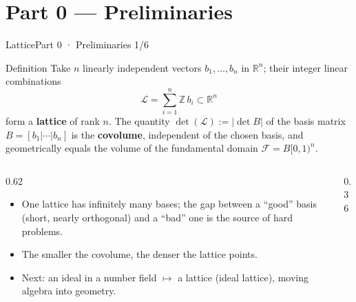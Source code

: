 \documentclass[aspectratio=169, 11pt]{beamer}
\newcommand{\R}{\mathbb{R}}
\newcommand{\Z}{\mathbb{Z}}
\begin{document}
\section{Part 0 --- Preliminaries}

\begin{frame}{Lattice}{Part 0 · Preliminaries 1/6}
  \begin{block}{Definition}
    Take $n$ linearly independent vectors $b_1,\dots,b_n$ in $\R^n$; their integer linear combinations
    \[
      \mathcal{L}=\sum_{i=1}^n \Z\, b_i \subset \R^n
    \]
    form a \textbf{lattice} of rank $n$. The quantity $\det(\mathcal{L}):=|\det B|$ of the basis matrix
    $B=[b_1|\cdots|b_n]$ is the \textbf{covolume}, independent of the chosen basis, and geometrically
    equals the volume of the fundamental domain $\mathcal{F}=B[0,1)^n$.
  \end{block}
  \begin{columns}[c]
    \begin{column}{0.62\textwidth}
      \begin{itemize}\small
        \item One lattice has infinitely many bases; the gap between a ``good'' basis (short, nearly orthogonal) and a ``bad'' one is the source of hard problems.
        \item The smaller the covolume, the denser the lattice points.
        \item Next: an ideal in a number field $\mapsto$ a lattice (ideal lattice), moving algebra into geometry.
      \end{itemize}
    \end{column}
    \begin{column}{0.36\textwidth}
      \centering
    \end{column}
  \end{columns}
\end{frame}
\end{document}
